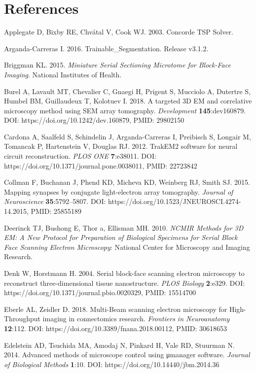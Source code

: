\documentclass{article}
\newenvironment{reflist}{\par\small\setlength{\parindent}{0pt}\everypar{\hangindent=2.2em\hangafter=1}}{\par}
\begin{document}
\section*{References}

\begin{reflist}
Applegate D, Bixby RE, Chvátal V, Cook WJ. 2003. Concorde TSP Solver.

Arganda-Carreras I. 2016. Trainable\_Segmentation. Release v3.1.2.

Briggman KL. 2015. \emph{Miniature Serial Sectioning Microtome for Block-Face Imaging}. National Institutes of Health.

Burel A, Lavault MT, Chevalier C, Gnaegi H, Prigent S, Mucciolo A, Dutertre S, Humbel BM, Guillaudeux T, Kolotuev I. 2018. A targeted 3D EM and correlative microscopy method using SEM array tomography. \emph{Development} \textbf{145}:dev160879. DOI: https://doi.org/10.1242/dev.160879, PMID: 29802150

Cardona A, Saalfeld S, Schindelin J, Arganda-Carreras I, Preibisch S, Longair M, Tomancak P, Hartenstein V, Douglas RJ. 2012. TrakEM2 software for neural circuit reconstruction. \emph{PLOS ONE} \textbf{7}:e38011. DOI: https://doi.org/10.1371/journal.pone.0038011, PMID: 22723842

Collman F, Buchanan J, Phend KD, Micheva KD, Weinberg RJ, Smith SJ. 2015. Mapping synapses by conjugate light-electron array tomography. \emph{Journal of Neuroscience} \textbf{35}:5792–5807. DOI: https://doi.org/10.1523/JNEUROSCI.4274-14.2015, PMID: 25855189

Deerinck TJ, Bushong E, Thor a, Ellisman MH. 2010. \emph{NCMIR Methods for 3D EM: A New Protocol for Preparation of Biological Specimens for Serial Block Face Scanning Electron Microscopy}: National Center for Microscopy and Imaging Research.

Denk W, Horstmann H. 2004. Serial block-face scanning electron microscopy to reconstruct three-dimensional tissue nanostructure. \emph{PLOS Biology} \textbf{2}:e329. DOI: https://doi.org/10.1371/journal.pbio.0020329, PMID: 15514700

Eberle AL, Zeidler D. 2018. Multi-Beam scanning electron microscopy for High-Throughput imaging in connectomics research. \emph{Frontiers in Neuroanatomy} \textbf{12}:112. DOI: https://doi.org/10.3389/fnana.2018.00112, PMID: 30618653

Edelstein AD, Tsuchida MA, Amodaj N, Pinkard H, Vale RD, Stuurman N. 2014. Advanced methods of microscope control using μmanager software. \emph{Journal of Biological Methods} \textbf{1}:10. DOI: https://doi.org/10.14440/jbm.2014.36


\end{reflist}
\end{document}
